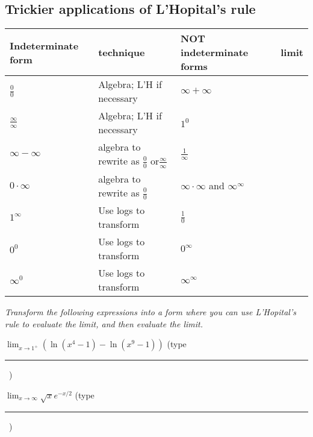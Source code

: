 \documentclass[11pt,fleqn]{article}
\renewcommand{\d}{\displaystyle}
\newcommand{\ans}[1][2]{ \ \rule{#1 in}{.5 pt} \ }
\begin{document}
  \vspace{.4\textheight}

 
 \subsection*{Trickier applications of L'Hopital's rule}
 


{\renewcommand{\arraystretch}{1.7}
\begin{tabular}{ |l | l || l  | l|}
\hline \hline
{\bf Indeterminate form} & technique &  {\bf NOT indeterminate forms}  & limit \\ \hline
$\frac{0}{0}$ & Algebra; L'H if necessary &  $\infty + \infty$ & %
\\ \hline
$\frac{\infty}{\infty}$ & Algebra; L'H if necessary &  $1^{0}$ & %
\\ \hline
$\infty - \infty$ & algebra to rewrite as $\frac{0}{0}$ or$\frac{\infty}{\infty}$&  $\frac{1}{\infty}$ & %
\\ \hline
$0\cdot \infty$ &algebra to rewrite as $\frac{0}{0}$  &  $\infty \cdot \infty$ and $\infty^{\infty}$ & %
\\ \hline
$1^{\infty}$ & Use logs to transform &  $\frac{1}{0}$ & %
\\ \hline
$0^{0}$ & Use logs to transform &  $0^{\infty}$ & %
\\ \hline
$\infty^{0}$ & Use logs to transform &  $\infty^{\infty}$ & \\ 
\hline \hline
 \end{tabular}
 }
 
 \bigskip
 
\emph{ Transform the following expressions into a form where you can use L'Hopital's rule to evaluate the limit, and then evaluate the limit.}
 
 \item $\d \lim_{x \to 1^+} \left( \ln (x^4-1) - \ln(x^9-1) \right)$ \hspace{1cm}(type \ans[1])
\vfill
 
 
 \item  $\d \lim_{x \to \infty} \sqrt{x}e^{-x/2}$ \hspace{1cm}(type \ans[1])
 \vfill
 
\end{document}
